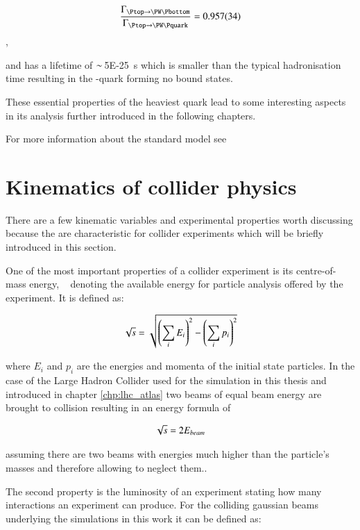 \begin{align}
\frac{\Gamma_{\Ptop \rightarrow \PW \Pbottom}}{\Gamma_{\Ptop \rightarrow \PW \Pquark}} = \SI{0.957(34)}{}
\end{align},

and has a lifetime of $\sim\!$ \SI{5E-25}{\second} which is smaller than the typical hadronisation time resulting in the \Ptop-quark forming no bound states.

These essential properties of the heaviest quark lead to some interesting aspects in its analysis further introduced in the following chapters.


For more information about the standard model see ~\cite{thomson, griffiths}




\section{Kinematics of collider physics}

There are a few kinematic variables and experimental properties worth discussing because the are characteristic for collider experiments which will be briefly introduced in this section.

One of the most important properties of a collider experiment is its centre-of-mass energy, \Ecms~ denoting the available energy for particle analysis offered by the experiment.
It is defined as:

\begin{align}
\sqrt{s} = \sqrt{ \left( \sum_i E_i \right)^2 - \left( \sum_i p_i \right)^2 }
\end{align}


where $E_i$ and $p_i$ are the energies and momenta of the initial state particles.
In the case of the Large Hadron Collider used for the simulation in this thesis and introduced in chapter \ref{chp:lhc_atlas} two beams of equal beam energy are brought to collision resulting in an energy formula of

\begin{align}
\sqrt{s} = 2 E_{beam}
\end{align}

assuming there are two beams with energies much higher than the particle's masses and therefore allowing to neglect them..

The second property is the luminosity of an experiment stating how many interactions an experiment can produce. For the colliding gaussian beams underlying the simulations in this work it can be defined as:

